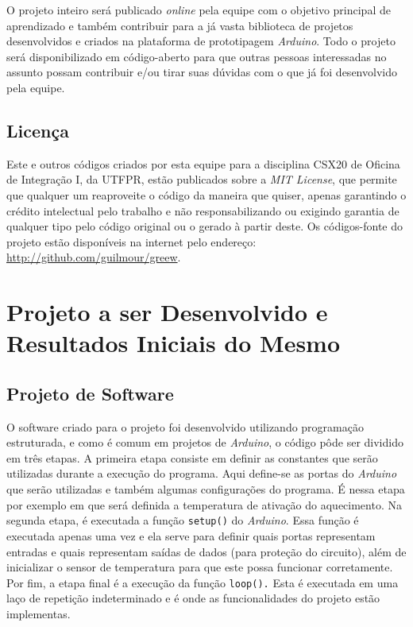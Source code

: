 \documentclass[a4paper,12pt]{article}
\begin{document}
O projeto inteiro será publicado \textit{online} pela equipe com o objetivo principal de aprendizado e também contribuir para a já vasta biblioteca de projetos desenvolvidos e criados na plataforma de prototipagem \textit{Arduino}. Todo o projeto será disponibilizado em código-aberto para que outras pessoas interessadas no assunto possam contribuir e/ou tirar suas dúvidas com o que já foi desenvolvido pela equipe.

\subsection{Licença}

Este e outros códigos criados por esta equipe para a disciplina CSX20 de Oficina de Integração I, da UTFPR, estão publicados sobre a \textit{MIT License}, que permite que qualquer um reaproveite o código da maneira que quiser, apenas garantindo o crédito intelectual pelo trabalho e não responsabilizando ou exigindo garantia de qualquer tipo pelo código original ou o gerado à partir deste. Os códigos-fonte do projeto estão disponíveis na internet pelo endereço: \href{http://github.com/guilmour/greew}{http://github.com/guilmour/greew}.




\section{Projeto a ser Desenvolvido e Resultados Iniciais do Mesmo}

\subsection{Projeto de Software}

O software criado  para o projeto foi desenvolvido utilizando programação estruturada, e como é comum em projetos de \textit{Arduino}, o código pôde ser dividido em três etapas. A primeira etapa consiste em definir as constantes que serão utilizadas durante a execução do programa. Aqui define-se as portas do \textit{Arduino} que serão utilizadas e também algumas configurações do programa. É nessa etapa por exemplo em que será definida a temperatura de ativação do aquecimento. Na segunda etapa, é executada a função \texttt{setup()} do \textit{Arduino}. Essa função é executada apenas uma vez e ela serve para definir quais portas representam entradas e quais representam saídas de dados (para proteção do circuito), além de inicializar o sensor de temperatura para que este possa funcionar corretamente. Por fim, a etapa final é a execução da função \texttt{loop().} Esta é executada em uma laço de repetição indeterminado e é onde as funcionalidades do projeto estão implementas.
\end{document}
